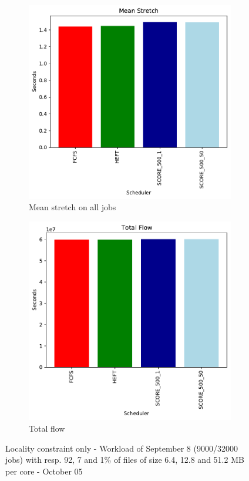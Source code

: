 \documentclass[a4paper]{article}
\begin{document}
\begin{figure}[H]
\begin{subfigure}[b]{0.4\linewidth}\centering\includegraphics[width=0.9\linewidth]{MBSS/plot/Results_FCFS_Score_Adaptative_Multiplier_2022-09-08->2022-09-08_V9271_Mean_Stretch_450_128_32_256_4_1024.pdf}\caption{Mean stretch on all jobs}\end{subfigure}
\begin{subfigure}[b]{0.4\linewidth}\centering\includegraphics[width=0.9\linewidth]{MBSS/plot/Results_FCFS_Score_Adaptative_Multiplier_2022-09-08->2022-09-08_V9271_Total_flow_450_128_32_256_4_1024.pdf}\caption{Total flow}\end{subfigure}
\caption{Locality constraint only - Workload of September 8 (9000/32000 jobs) with resp. 92, 7 and 1\% of files of size 6.4, 12.8 and 51.2 MB per core - October 05}\end{figure}
\end{document}

